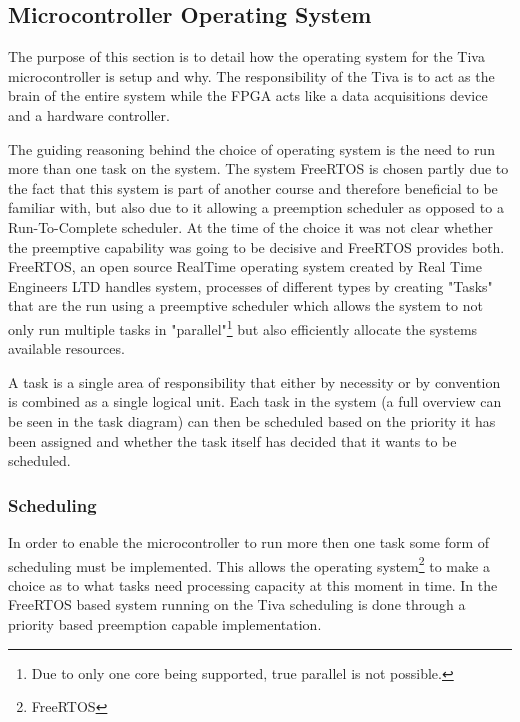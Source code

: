 \documentclass[../../../main]{subfiles}
\begin{document}
\subsection{Microcontroller Operating System}

The purpose of this section is to detail  how the operating system for the Tiva microcontroller is setup  and why. The responsibility of the Tiva is to act as the brain of the entire system while the FPGA acts like a data acquisitions device and a hardware controller.

The guiding  reasoning behind the choice of operating system is the need to run more than one task on the system. The system FreeRTOS is chosen partly due to the fact that this system  is part of another course and therefore beneficial to be familiar with, but also due to it allowing a preemption scheduler as opposed to a Run-To-Complete scheduler. At the time of the choice it was not clear whether the preemptive capability was going to be decisive and FreeRTOS provides both.
\\

FreeRTOS, an open source RealTime operating system created by Real Time Engineers LTD handles system, processes of different types by creating "Tasks" that are the run using a preemptive scheduler which allows the system to not only run multiple tasks in "parallel"\footnote{Due to only one core being supported, true parallel is not possible.}  but also efficiently allocate the systems available resources.


A task is a single area of responsibility that either by necessity or by convention is combined as a single logical unit. Each task in the system (a full overview can be seen in the task diagram) can then be scheduled based on the priority it has been assigned and whether the task itself has decided that it wants to be scheduled.

\subsubsection{Scheduling}

In order to enable the microcontroller to run more then one task some form of scheduling must be implemented. This allows the operating system\footnote{FreeRTOS} to make a choice as to what tasks need processing capacity at this moment in time. In the FreeRTOS based system running on the Tiva scheduling is done through a priority based preemption capable implementation.
\end{document}
